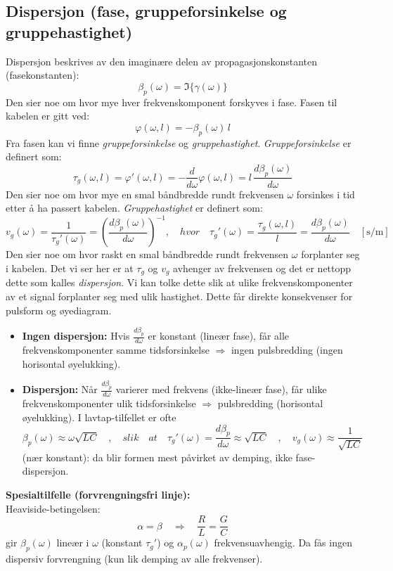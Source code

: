 \subsection{Dispersjon (fase, gruppeforsinkelse og gruppehastighet)}
Dispersjon beskrives av den imaginære delen av propagasjonskonstanten (fasekonstanten):
\[
    \beta_p(\omega)=\Im\{\gamma(\omega)\}
\]
Den sier noe om hvor mye hver frekvenskomponent forskyves i fase.
Fasen til kabelen er gitt ved:
\[
\varphi(\omega,l) = -\beta_p(\omega)\,l
\]
Fra fasen kan vi finne \emph{gruppeforsinkelse} og \emph{gruppehastighet}.
\emph{Gruppeforsinkelse} er definert som:
\[
\tau_g(\omega,l) = \varphi'(\omega,l) = -\frac{d}{d\omega}\varphi(\omega,l) = l\,\frac{d\beta_p(\omega)}{d\omega}
\]
Den sier noe om hvor mye en smal båndbredde rundt frekvensen \(\omega\) forsinkes i tid etter å ha passert kabelen. \emph{Gruppehastighet} er definert som:
\[
v_g(\omega) = \frac{1}{\tau_{g}'(\omega)} = \left(\frac{d\beta_p(\omega)}{d\omega}\right)^{-1}, \quad hvor \quad \tau_g'(\omega) = \frac{\tau_g(\omega,l)}{l} = \frac{d\beta_p(\omega)}{d\omega} \quad [\mathrm{s/m}]
\]
\noindent Den sier noe om hvor raskt en smal båndbredde rundt frekvensen \(\omega\) forplanter seg i kabelen. Det vi ser her er at \(\tau_g\) og \(v_g\) avhenger av frekvensen og det er nettopp dette som kalles \emph{dispersjon}. Vi kan tolke dette slik at ulike frekvenskomponenter av et signal forplanter seg med ulik hastighet. 
\clearpage
\noindent Dette får direkte konsekvenser for pulsform og øyediagram.\\
\begin{itemize}[leftmargin=2.8em,style=nextline]
  \item \textbf{Ingen dispersjon:} Hvis \(\frac{d\beta_p}{d\omega} \) er konstant (lineær fase), får alle frekvenskomponenter samme tidsforsinkelse \(\Rightarrow\) ingen pulsbredding (ingen horisontal øyelukking).\\
  \item \textbf{Dispersjon:} Når \(\frac{d\beta_p}{d\omega}\) varierer med frekvens (ikke-lineær fase), får ulike frekvenskomponenter ulik tidsforsinkelse \(\Rightarrow\) pulsbredding (horisontal øyelukking). I lavtap-tilfellet er ofte 
  \[
    \beta_p(\omega)\approx \omega\sqrt{LC}\quad,\quad slik\quad at \quad \tau_{g}'(\omega)=\frac{d\beta_p}{d\omega}\approx \sqrt{LC}\quad,\quad v_g(\omega)\approx \frac{1}{\sqrt{LC}}
  \]
  (nær konstant): da blir formen mest påvirket av demping, ikke fase-dispersjon.\\
\end{itemize}
\textbf{Spesialtilfelle (forvrengningsfri linje):}\\
Heaviside-betingelsen:
\[
    \alpha = \beta \quad \Rightarrow \quad \frac{R}{L}=\frac{G}{C}
\]
gir \(\beta_p(\omega)\) lineær i \(\omega\)
(konstant \(\tau_g'\)) og \(\alpha_p(\omega)\) frekvensuavhengig. Da fås ingen dispersiv forvrengning (kun lik demping av alle frekvenser).


